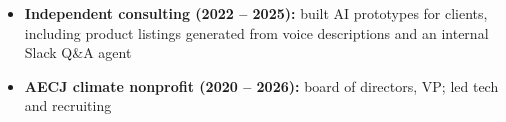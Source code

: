 \documentclass{my_cv}
\begin{document}

\begin{itemize}
\item \textbf{Independent consulting (2022 -- 2025):} built AI prototypes for clients, including product listings generated from voice descriptions and an internal Slack Q\&A agent
\item \textbf{AECJ climate nonprofit (2020 -- 2026):} board of directors, VP; led tech and recruiting
\end{itemize}
\end{document}
